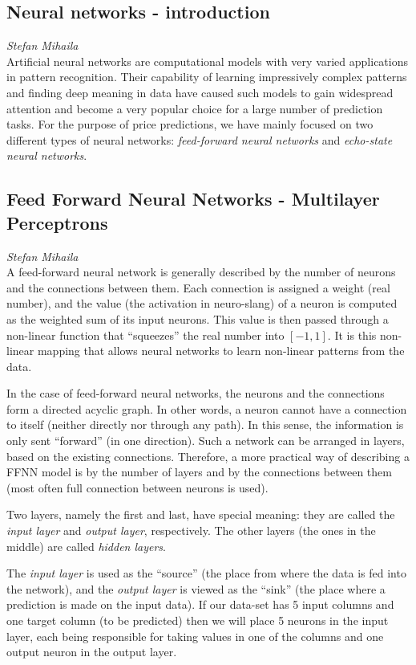 \subsection*{Neural networks - introduction}
\emph{Stefan Mihaila}\\
Artificial neural networks are computational models with very varied
applications in pattern recognition. Their capability of learning impressively
complex patterns and finding deep meaning in data have caused such models
to gain widespread attention and become a very popular choice for a large
number of prediction tasks. For the purpose of price predictions, we have
mainly focused on two different types of neural networks: \emph{feed-forward
neural networks} and \emph{echo-state neural networks}.

\subsection*{Feed Forward Neural Networks - Multilayer Perceptrons}
\emph{Stefan Mihaila}\\
A feed-forward neural network is generally described by the number of neurons
and the connections between them. Each connection is assigned a weight (real
number), and the value (the activation in neuro-slang) of a neuron is computed
as the weighted sum of its input neurons. This value is then passed through a
non-linear function that ``squeezes'' the real number into $[-1, 1]$. It is
this non-linear mapping that allows neural networks to learn non-linear
patterns from the data.

In the case of feed-forward neural networks, the neurons and the connections
form a directed acyclic graph. In other words, a neuron cannot have a
connection to itself (neither directly nor through any path). In this sense,
the information is only sent ``forward'' (in one direction). Such a network can
be arranged in layers, based on the existing connections. Therefore, a more
practical way of describing a FFNN model is by the number of layers and by
the connections between them (most often full connection between neurons is
used).

Two layers, namely the first and last, have special meaning: they are called
the \emph{input layer} and \emph{output layer}, respectively.
The other layers (the ones in the middle) are called \emph{hidden layers}.

The \emph{input layer} is used as the ``source'' (the place from where the data
is fed into the network), and the \emph{output layer} is viewed as the ``sink''
(the place where a prediction is made on the input data). If our data-set has 5
input columns and one target column (to be predicted) then we will place 5
neurons in the input layer, each being responsible for taking values in one of
the columns and one output neuron in the output layer.

